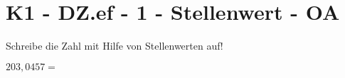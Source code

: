 \section{K1 - DZ.ef - 1 - Stellenwert - OA}

\begin{beispiel}{0} %
				Schreibe die Zahl mit Hilfe von Stellenwerten auf!\leer
					
					$203,0457=$ 
\end{beispiel}